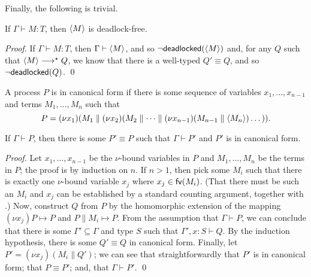\documentclass[orivec,envcountsame]{llncs}
\begin{document}
Finally, the following is trivial.

\begin{theorem}\label{thm:typed-terms-df}
  If $\Gamma \vdash M: T$, then $\langle M \rangle$ is deadlock-free.
\end{theorem}

\begin{proof}
  If $\Gamma \vdash M: T$, then $\Gamma \vdash \langle M \rangle$, and so
  $\lnot\mathsf{deadlocked}(\langle M \rangle)$ and, for any $Q$ such that $\langle M \rangle \longrightarrow^\star Q$, we
  know that there is a well-typed $Q' \equiv Q$, and so $\lnot\mathsf{deadlocked}(Q)$. \qed
\end{proof}


\begin{definition}
A process $P$ is in canonical form if there is some sequence of variables $x_1,\dots,x_{n-1}$ and
terms $M_1,\dots,M_n$ such that
\[
  P = (\nu x_1)(M_1 \parallel (\nu x_2)(M_2 \parallel \dots \parallel (\nu x_{n-1})(M_{n-1} \parallel \langle M_n \rangle)\dots)).
\]
\end{definition}

\begin{lemma}
  If $\Gamma \vdash P$, then there is some $P' \equiv P$ such that $\Gamma \vdash P'$ and $P'$ is in
  canonical form.
\end{lemma}

\begin{proof}
  Let $x_1,\dots,x_{n-1}$ be the $\nu$-bound variables in $P$ and $M_1,\dots,M_n$ be the terms in
  $P$; the proof is by induction on $n$.  If $n > 1$, then pick some $M_i$ such that there is
  exactly one $\nu$-bound variable $x_j$ where $x_j \in \mathsf{fv}(M_i)$.  (That there must be such an
  $M_i$ and $x_j$ can be established by a standard counting argument, together with
  .)  Now, construct $Q$ from $P$ by the homomorphic extension of
  the mapping $(\nu x_j)P \mapsto P$ and $P \parallel M_i \mapsto P$.  From the assumption that
  $\Gamma \vdash P$, we can conclude that there is some $\Gamma' \subseteq \Gamma$ and type $S$ such
  that $\Gamma',x:S \vdash Q$.  By the induction hypothesis, there is some $Q' \equiv Q$ in
  canonical form.  Finally, let $P' = (\nu x_j)(M_i \parallel Q')$; we can see that
  straightforwardly that $P'$ is in canonical form; that $P \equiv P'$; and, that $\Gamma \vdash
  P'$. \qed
\end{proof}
\end{document}
